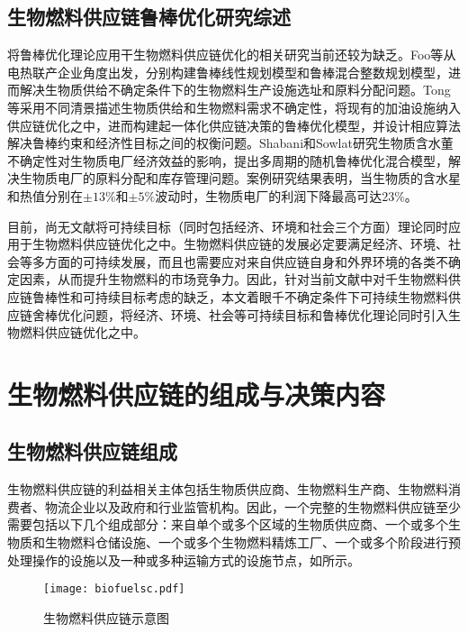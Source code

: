 \subsection{生物燃料供应链鲁棒优化研究综述}
将鲁棒优化理论应用干生物燃料供应链优化的相关研究当前还较为缺乏。Foo等\cite{Foo2013}从电热联产企业角度出发，分别构建鲁棒线性规划模型和鲁棒混合整数规划模型，进而解决生物质供给不确定条件下的生物燃料生产设施选址和原料分配问题。Tong等\cite{Tong2014a}采用不同清景描述生物质供给和生物燃料需求不确定性，将现有的加油设施纳入供应链优化之中，进而构建起一体化供应链决策的鲁棒优化模型，并设计相应算法解决鲁棒约束和经济性目标之间的权衡问题。Shabani和Sowlat\cite{Shabani2016}研究生物质含水董不确定性对生物质电厂经济效益的影响，提出多周期的随机鲁棒优化混合模型，解决生物质电厂的原料分配和库存管理问题。案例研究结果表明，当生物质的含水星和热值分别在$\pm13\%$和$\pm5\%$波动时，生物质电厂的利润下降最高可达$23\%$。

目前，尚无文献将可持续目标（同时包括经济、环境和社会三个方面）理论同时应用于生物燃料供应链优化之中。生物燃料供应链的发展必定要满足经济、环境、社会等多方面的可持续发展，而且也需要应对来自供应链自身和外界环境的各类不确定因素，从而提升生物燃料的市场竞争力。因此，针对当前文献中对千生物燃料供应链鲁棒性和可持续目标考虑的缺乏，本文着眼千不确定条件下可持续生物燃料供应链舍棒优化问题，将经济、环境、社会等可持续目标和鲁棒优化理论同时引入生物燃料供应链优化之中。

\section{生物燃料供应链的组成与决策内容}

\subsection{生物燃料供应链组成}

生物燃料供应链的利益相关主体包括生物质供应商、生物燃料生产商、生物燃料消费者、物流企业以及政府和行业监管机构\cite{Seay2014}。因此，一个完整的生物燃料供应链至少需要包括以下几个组成部分：来自单个或多个区域的生物质供应商、一个或多个生物质和生物燃料仓储设施、一个或多个生物燃料精炼工厂、一个或多个阶段进行预处理操作的设施以及一种或多种运输方式的设施节点\cite{Shabani2013}，如所示。
\begin{figure}[htbp]
	\centering
	\texttt{[image: biofuelsc.pdf]}
		\setlength{\abovecaptionskip}{0pt}%

	\setlength{\belowcaptionskip}{0pt}%
	\caption{生物燃料供应链示意图}

	\label{fig:biofuelsc}
\end{figure}

